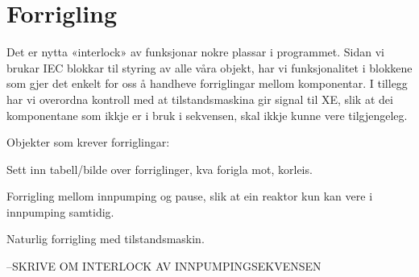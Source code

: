 \section{Forrigling}
\thispagestyle{fancy}

Det er nytta «interlock» av funksjonar nokre plassar i programmet. 
Sidan vi brukar IEC blokkar til styring av alle våra objekt, har vi funksjonalitet i blokkene som gjer det enkelt for oss å handheve forriglingar mellom komponentar. I tillegg har vi overordna kontroll med at tilstandsmaskina gir signal til XE, slik at dei komponentane som ikkje er i bruk i sekvensen, skal ikkje kunne vere tilgjengeleg.

Objekter som krever forriglingar:

Sett inn tabell/bilde over forriglinger, kva forigla mot, korleis.

Forrigling mellom innpumping og pause, slik at ein reaktor kun kan vere i innpumping samtidig.

Naturlig forrigling med tilstandsmaskin.

--SKRIVE OM INTERLOCK AV INNPUMPINGSEKVENSEN

